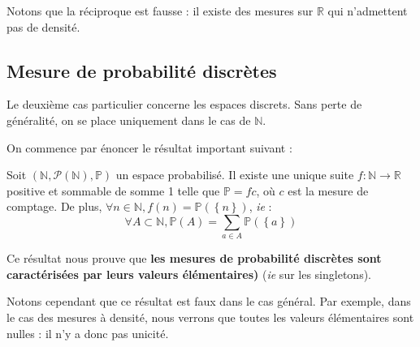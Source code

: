\documentclass[../integ-proba.tex]{subfiles}
\begin{document}
            \begin{rem}
                Notons que la réciproque est fausse : il existe des mesures sur $\mathbb{R}$ qui n'admettent pas de densité.
            \end{rem}



        \subsection{Mesure de probabilité discrètes}
            Le deuxième cas particulier concerne les espaces discrets.
            Sans perte de généralité, on se place uniquement dans le cas de $\mathbb{N}$.

            On commence par énoncer le résultat important suivant :

            \begin{thm}
                Soit $\left(\mathbb{N}, \mathcal{P}(\mathbb{N}), \mathbb{P} \right)$ un espace probabilisé.
                Il existe une unique suite $f:\mathbb{N} \rightarrow \mathbb{R}$ positive et sommable de somme 1 telle que $\mathbb{P} = f c$, où $c$ est la mesure de comptage.
                De plus, $\forall n \in \mathbb{N}, f(n)=\mathbb{P}(\left\{n\right\})$, \textit{ie} :
                \begin{displaymath}
                    \forall A \subset \mathbb{N}, \mathbb{P}(A) = \sum_{a \in A} \mathbb{P}(\left\{ a \right\})
                \end{displaymath}
            \end{thm}

            \begin{rem}
                Ce résultat nous prouve que \textbf{les mesures de probabilité discrètes sont caractérisées par leurs valeurs élémentaires)} (\textit{ie} sur les singletons).

                Notons cependant que ce résultat est faux dans le cas général.
                Par exemple, dans le cas des mesures à densité, nous verrons que toutes les valeurs élémentaires sont nulles : il n'y a donc pas unicité.
            \end{rem}

\end{document}
